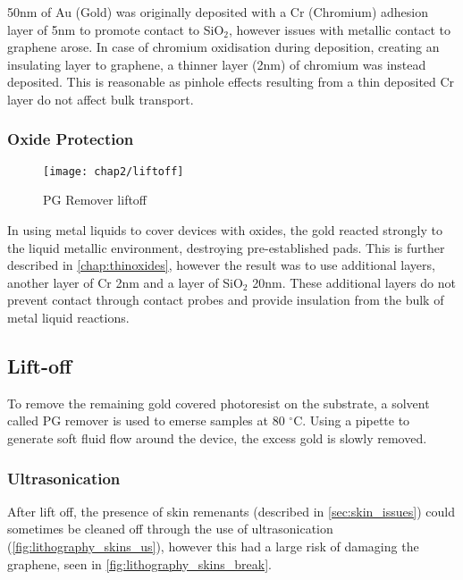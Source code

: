\documentclass[../../Matt_Gebert_Honours_Thesis.tex]{subfiles}
\begin{document}
	50nm of Au (Gold) was originally deposited with a Cr (Chromium) adhesion layer of 5nm to promote contact to SiO$_2$, however issues with metallic contact to graphene arose. In case of chromium oxidisation during deposition, creating an insulating layer to graphene, a thinner layer (2nm) of chromium was instead deposited. This is reasonable as pinhole effects resulting from a thin deposited Cr layer do not affect bulk transport.
	
	\subsubsection{Oxide Protection}\label{sec:deposition_oxide_protection}
	
	\begin{wrapfigure}[13]{r}[0pt]{5.5cm}
		\vspace{-1cm}
		\centering
		\texttt{[image: chap2/liftoff]}
		\caption{PG Remover liftoff}\label{fig:liftoff}
	\end{wrapfigure}

	In using metal liquids to cover devices with oxides, the gold reacted strongly to the liquid metallic environment, destroying pre-established pads. This is further described in \cref{chap:thinoxides}, however the result was to use additional layers, another layer of Cr 2nm and a layer of SiO$_2$ 20nm. These additional layers do not prevent contact through contact probes and provide insulation from the bulk of metal liquid reactions.
	
	\subsection{Lift-off}\label{sec:liftoff}
	To remove the remaining gold covered photoresist on the substrate, a solvent called PG remover is used to emerse samples at 80 $^\circ$C. Using a pipette to generate soft fluid flow around the device, the excess gold is slowly removed. 
	
	\subsubsection{Ultrasonication}\label{sec:ultrasonication}
	After lift off, the presence of skin remenants (described in \cref{sec:skin_issues}) could sometimes be cleaned off through the use of ultrasonication (\cref{fig:lithography_skins_us}), however this had a large risk of damaging the graphene, seen in \cref{fig:lithography_skins_break}.
	
\end{document}
